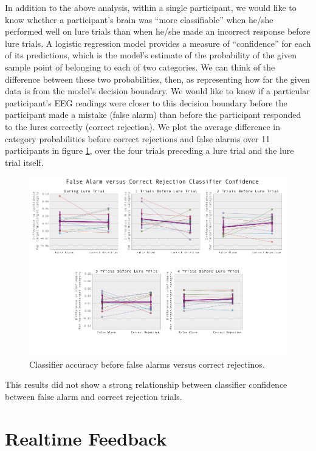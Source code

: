 \documentclass[12pt]{report}
\begin{document}
	In addition to the above analysis, within a single participant, we would like to know whether a participant's brain was ``more classifiable'' when he/she performed well on lure trials than when he/she made an incorrect response before lure trials.  A logistic regression model provides a measure of ``confidence'' for each of its predictions, which is the model's estimate of the probability of the given sample point of belonging to each of two categories.  We can think of the difference between these two probabilities, then, as representing how far the given data is from the model's decision boundary.  We would like to know if a particular participant's EEG readings were closer to this decision boundary before the participant made a mistake (false alarm) than before the participant responded to the lures correctly (correct rejection).  We plot the average difference in category probabilities before correct rejections and false alarms over 11 participants in figure \ref{falsealarmcorrectreject}, over the four trials preceding a lure trial and the lure trial itself.  

\begin{figure}[t]
\centerline{
\includegraphics[width=6in]{trialsbeforelureacc}
}
\caption{Classifier accuracy before false alarms versus correct rejectinos.\label{falsealarmcorrectreject}}
\end{figure}

	This results did not show a strong relationship between classifier confidence between false alarm and correct rejection trials.

\section{Realtime Feedback}
\end{document}

